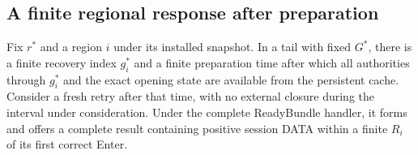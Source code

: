 \subsection{A finite regional response after preparation}
\label{sec:v35-regional-response}
\begin{proposition}
\label{prop:v35-regional-response}
Fix $r^*$ and a region $i$ under its installed snapshot. In a tail with
fixed $G^*$, there is a finite recovery index $g_i^*$ and a finite
preparation time after which all authorities through $g_i^*$ and the
exact opening state are available from the persistent cache. Consider
a fresh retry after that time, with no external closure during the
interval under consideration. Under the complete ReadyBundle handler,
it forms and offers a complete result containing positive session DATA
within a finite $R_i$ of its first correct Enter.
\end{proposition}
